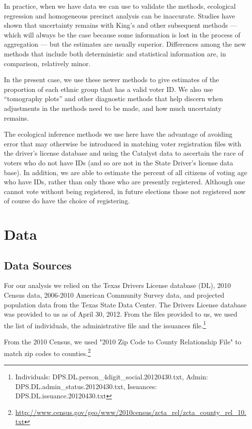 \documentclass[12pt]{article}
\begin{document}
In practice, when we have data we can use to validate the methods,
ecological regression and homogeneous precinct analysis can be
inaccurate.  Studies have shown that uncertainty remains with King's
and other subsequent methods --- which will always be the case because
some information is lost in the process of aggregation --- but the
estimates are usually superior. Differences among the new methods that
include both deterministic and statistical information are, in
comparison, relatively minor.

In the present case, we use these newer methods to give estimates of
the proportion of each ethnic group that has a valid voter ID.  We
also use ``tomography plots'' and other diagnostic methods that help
discern when adjustments in the methods need to be made, and how much
uncertainty remains.

The ecological inference methods we use here have the advantage of
avoiding error that may otherwise be introduced in matching voter
registration files with the driver's license database and using the
Catalyst data to ascertain the race of voters who do not have IDs (and
so are not in the State Driver's license data base).  In addition, we
are able to estimate the percent of all citizens of voting age who
have IDs, rather than only those who are presently registered.
Although one cannot vote without being registered, in future elections
those not registered now of course do have the choice of registering.

\section{Data}\label{s:data}
\subsection{Data Sources}
For our analysis we relied on the Texas Drivers License database (DL),
2010 Census data, 2006-2010 American Community Survey data, and
projected population data from the Texas State Data Center.  The
Drivers License database was provided to us as of April 30, 2012.
From the files provided to us, we used the list of individuals, the
administrative file and the issuances file.\footnote{Individuals:
  DPS.DL.person\_4digit\_social.20120430.txt, Admin:
  DPS.DL.admin\_status.20120430.txt, Issuances:
  DPS.DL.issuance.20120430.txt}

From the 2010 Census, we used "2010 Zip Code to County Relationship File" to match zip codes to counties.\footnote{\url{http://www.census.gov/geo/www/2010census/zcta_rel/zcta_county_rel_10.txt}}
\end{document}
